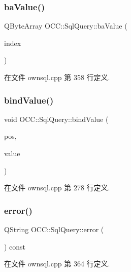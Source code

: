 \subsubsection{\texorpdfstring{ba\+Value()}{baValue()}}
{\footnotesize\ttfamily Q\+Byte\+Array O\+C\+C\+::\+Sql\+Query\+::ba\+Value (\begin{DoxyParamCaption}\item[{int}]{index }\end{DoxyParamCaption})}



在文件 ownsql.\+cpp 第 358 行定义.

\mbox{\label{class_o_c_c_1_1_sql_query_a77a3e166902417ceb51822f770bad229}} 
\subsubsection{\texorpdfstring{bind\+Value()}{bindValue()}}
{\footnotesize\ttfamily void O\+C\+C\+::\+Sql\+Query\+::bind\+Value (\begin{DoxyParamCaption}\item[{int}]{pos,  }\item[{const Q\+Variant \&}]{value }\end{DoxyParamCaption})}



在文件 ownsql.\+cpp 第 278 行定义.

\mbox{\label{class_o_c_c_1_1_sql_query_ab745f7e75b1a364ac4f51c8692145a22}} 
\subsubsection{\texorpdfstring{error()}{error()}}
{\footnotesize\ttfamily Q\+String O\+C\+C\+::\+Sql\+Query\+::error (\begin{DoxyParamCaption}{ }\end{DoxyParamCaption}) const}



在文件 ownsql.\+cpp 第 364 行定义.

\mbox{\label{class_o_c_c_1_1_sql_query_a863fdad1885a44c10e2f93038bb2ec37}} 
